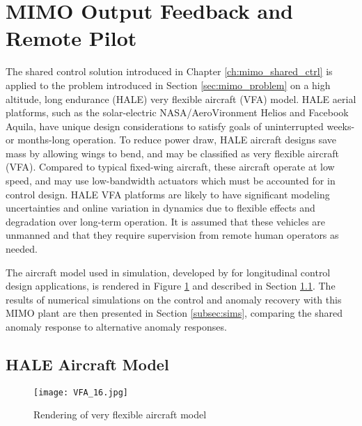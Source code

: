 \section{MIMO Output Feedback and Remote Pilot}
The shared control solution introduced in Chapter \ref{ch:mimo_shared_ctrl} is applied to the problem introduced in Section \ref{sec:mimo_problem} on a high altitude, long endurance (HALE) very flexible aircraft (VFA) model. HALE aerial platforms, such as the solar-electric NASA/AeroVironment Helios and Facebook Aquila, have unique design considerations to satisfy goals of uninterrupted weeks- or months-long operation. To reduce power draw, HALE aircraft designs save mass by allowing wings to bend, and may be classified as very flexible aircraft (VFA). Compared to typical fixed-wing aircraft, these aircraft operate at low speed, and may use low-bandwidth actuators which must be accounted for in control design. HALE VFA platforms are likely to have significant modeling uncertainties and online variation in dynamics due to flexible effects and degradation over long-term operation. It is assumed that these vehicles are unmanned and that they require supervision from remote human operators as needed.

The aircraft model used in simulation, developed by \cite{gibson2011modeling} for longitudinal control design applications, is rendered in Figure \ref{fig:vfa} and described in Section \ref{subsec:vfa_model}. The results of numerical simulations on the control and anomaly recovery with this MIMO plant are then presented in Section \ref{subsec:sims}, comparing the shared anomaly response to alternative anomaly responses.

\subsection{HALE Aircraft Model}\label{subsec:vfa_model}

\begin{figure}[htbp]
	\centering
	\texttt{[image: VFA\_16.jpg]}
	\caption{Rendering of very flexible aircraft model}
	\label{fig:vfa}
\end{figure}

